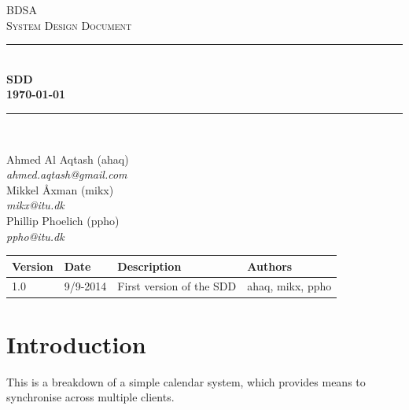 \documentclass[10pt]{report}
\numberwithin{equation}{section} %
\numberwithin{figure}{section} %
\numberwithin{table}{section} %
\newcommand{\HRule}{\rule{\linewidth}{0.5mm}}
\begin{document}
\begin{titlepage}

\begin{center}

\textsc{\LARGE BDSA}\\[1.5cm]

\textsc{\Large System Design Document}\\[0.5cm]

\HRule \\[0.4cm]

{ \bfseries SDD \\[0.5cm] 
    {\small \today}} \\[0.7cm]

\HRule \\ [6.5cm]

\begin{minipage}{0.5\textwidth}
\begin{flushleft} \large
Ahmed Al Aqtash (ahaq)\\
\textit{ahmed.aqtash@gmail.com}\\
Mikkel Åxman (mikx)\\
\textit{mikx@itu.dk}\\
Phillip Phoelich (ppho)\\
\textit{ppho@itu.dk}\\

\vfill 
\end{flushleft}
\end{minipage}

\end{center}

\end{titlepage}
\clearpage
\begin{table}[h]
\begin{tabularx}{\textwidth}{l l X l}
\textbf{Version} & \textbf{Date} & \textbf{Description} & \textbf{Authors} \\ \midrule
1.0     & 9/9-2014 & First version of the SDD & ahaq, mikx, ppho \\
\end{tabularx}
\end{table}

\clearpage
\section{Introduction}
This is a breakdown of a simple calendar system, which provides means to
synchronise across multiple clients.
\end{document}
